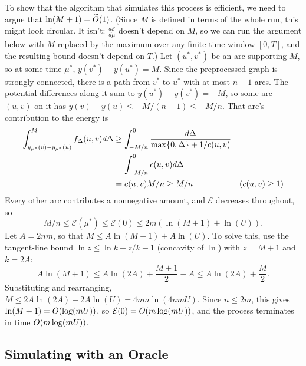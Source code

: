 \documentclass[12 pt]{article}
\begin{document}
To show that the algorithm that simulates this process is efficient, we need to
argue that $\ln(M + 1) = \apxO{1}$. (Since $M$ is defined in terms of the whole
run, this might look circular. It isn't: $\frac{d\mathcal{E}}{d\mu}$ doesn't
depend on $M$, so we can run the argument below with $M$ replaced by the maximum
over any finite time window $[0, T]$, and the resulting bound doesn't depend on
$T$.) Let $(u^*, v^*)$ be an arc supporting $M$, so at some time $\mu^*$,
$y(v^*) - y(u^*) = M$. Since the preprocessed graph is strongly connected, there
is a path from $v^*$ to $u^*$ with at most $n - 1$ arcs. The potential
differences along it sum to $y(u^*) - y(v^*) = -M$, so some arc $(u, v)$ on it
has $y(v) - y(u) \leq -M/(n - 1) \leq -M/n$. That arc's contribution to the
energy is
\begin{align*}
  \int_{y_{\mu^*}(v)-y_{\mu^*}(u)}^M f_\Delta(u, v) d\Delta & \geq \int_{-M/n}^0 \frac{d\Delta}{\max\Set{0, \Delta} + 1/c(u, v)}                    \\
                                                            & = \int_{-M/n}^0 c(u, v)d\Delta                                                        \\
                                                            & = c(u, v)M/n \geq M/n                                              & (c(u, v) \geq 1)
\end{align*}
Every other arc contributes a nonnegative amount, and $\mathcal{E}$ decreases
throughout, so
\[
  M/n \leq \mathcal{E}(\mu^*) \leq \mathcal{E}(0) \leq 2m(\ln(M + 1) + \ln(U)).
\]
Let $A = 2nm$, so that $M \leq A\ln(M + 1) + A\ln(U)$. To solve this, use the
tangent-line bound $\ln z \leq \ln k + z/k - 1$ (concavity of $\ln$) with
$z = M + 1$ and $k = 2A$:
\[
  A\ln(M + 1) \leq A\ln(2A) + \frac{M + 1}{2} - A \leq A\ln(2A) + \frac{M}{2}.
\]
Substituting and rearranging, $M \leq 2A\ln(2A) + 2A\ln(U) = 4nm\ln(4nmU)$.
Since $n \leq 2m$, this gives $\ln(M + 1) = \bigO{\log(mU)}$, so
$\mathcal{E}(0) = \bigO{m\log(mU)}$, and the process terminates in time
$\bigO{m\log(mU)}$.

\subsection{Simulating with an Oracle}
\label{sec:oracle}
\end{document}
